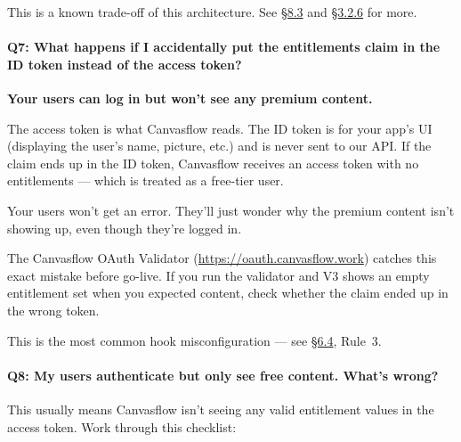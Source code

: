 This is a known trade-off of this architecture. See 
\hyperref[sec:freshly-evaluated-entitlements]{\S8.3} and 
\hyperref[sec:session-lifecycle]{\S3.2.6} for more.

\paragraph{Q7: What happens if I accidentally put the entitlements claim in the ID token
instead of the access token?}

\textbf{Your users can log in but won't see any premium content.}

The access token is what Canvasflow reads. The ID token is for your app's UI (displaying
the user's name, picture, etc.) and is never sent to our API. If the claim ends up in
the ID token, Canvasflow receives an access token with no entitlements --- which is treated
as a free-tier user.

Your users won't get an error. They'll just wonder why the premium content isn't showing
up, even though they're logged in.

The Canvasflow OAuth Validator (\url{https://oauth.canvasflow.work}) catches this exact
mistake before go-live. If you run the validator and V3 shows an empty entitlement set
when you expected content, check whether the claim ended up in the wrong token.



This is the most common hook misconfiguration --- see \hyperref[sec:hook-rules]{\S6.4}, Rule~3.

\paragraph{Q8: My users authenticate but only see free content. What's wrong?}

This usually means Canvasflow isn't seeing any valid entitlement values in the access
token. Work through this checklist:

